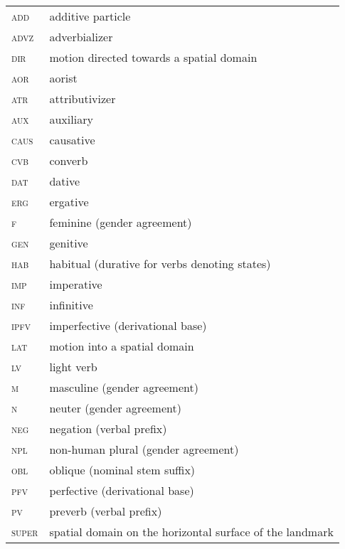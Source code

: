 ﻿\documentclass[output=paper]{langsci/langscibook}
\begin{document}
\begin{longtable}[l]{@{}ll@{}}
\textsc{add}	& additive particle \\
\textsc{advz}	& adverbializer \\
\textsc{dir}	& motion directed towards a spatial domain \\
\textsc{aor}	& aorist \\
\textsc{atr}	& attributivizer \\
\textsc{aux}	& auxiliary \\
\textsc{caus}	& causative \\
\textsc{cvb}	& converb \\
\textsc{dat}	& dative \\
\textsc{erg}	& ergative \\
\textsc{f}	& feminine (gender agreement) \\
\textsc{gen}	& genitive \\
\textsc{hab}	& habitual (durative for verbs denoting states) \\
\textsc{imp}	& imperative \\
\textsc{inf}	& infinitive \\
\textsc{ipfv}	& imperfective (derivational base) \\
\textsc{lat}	& motion into a spatial domain \\
\textsc{lv}	& light verb \\
\textsc{m}	& masculine (gender agreement) \\
\textsc{n}	& neuter (gender agreement) \\
\textsc{neg}	& negation (verbal prefix) \\
\textsc{npl}	& non-human plural (gender agreement) \\
\textsc{obl}	& oblique (nominal stem suffix) \\
\textsc{pfv}	& perfective (derivational base) \\
\textsc{pv}	& preverb (verbal prefix) \\
\textsc{super}	& spatial domain on the horizontal surface of the landmark \\
\end{longtable}

\printbibliography[heading=subbibliography,notkeyword=this]


\end{document}

